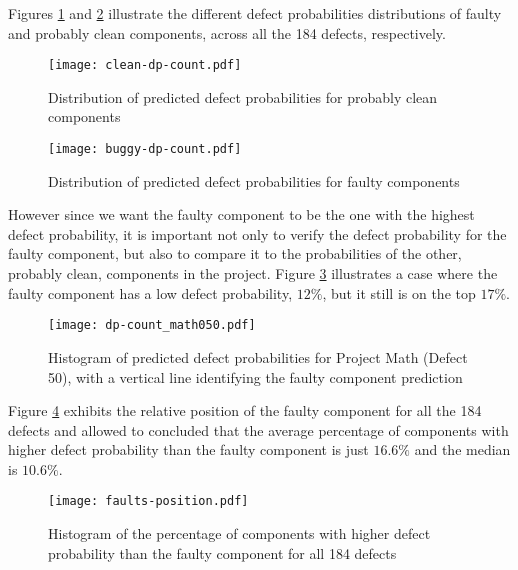Figures \ref{fig:clean-dp-count} and \ref{fig:buggy-dp-count} illustrate the different defect probabilities distributions of faulty and probably clean components, across all the 184 defects, respectively.
%
\begin{figure}[]
  \begin{center}
    \leavevmode
    \texttt{[image: clean-dp-count.pdf]}
    \caption{Distribution of predicted defect probabilities for probably clean components}
    \label{fig:clean-dp-count}
  \end{center}
\end{figure}
%
\begin{figure}[]
  \begin{center}
    \leavevmode
    \texttt{[image: buggy-dp-count.pdf]}
    \caption{Distribution of predicted defect probabilities for faulty components}
    \label{fig:buggy-dp-count}
  \end{center}
\end{figure}
%
However since we want the faulty component to be the one with the highest defect probability, it is important not only to verify the defect probability for the faulty component, but also to compare it to the probabilities of the other, probably clean, components in the project. Figure \ref{fig:dp-count} illustrates a case where the faulty component has a low defect probability, $12\%$, but it still is on the top $17\%$.
%
\begin{figure}[!]
  \begin{center}
    \leavevmode
    \texttt{[image: dp-count\_math050.pdf]}
    \caption{Histogram of predicted defect probabilities for Project Math (Defect 50), with a vertical line identifying the faulty component prediction}
    \label{fig:dp-count}
  \end{center}
\end{figure}

Figure \ref{fig:dp-faults-position} exhibits the relative position of the faulty component for all the 184 defects and allowed to concluded that the average percentage of components with higher defect probability than the faulty component is just $16.6\%$ and the median is $10.6\%$.

\begin{figure}[!]
  \begin{center}
    \leavevmode
    \texttt{[image: faults-position.pdf]}
    \caption{Histogram of the percentage of components with higher defect probability than the faulty component for all 184 defects}
    \label{fig:dp-faults-position}
  \end{center}
\end{figure}

